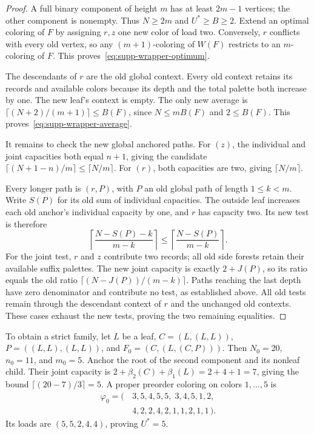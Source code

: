 \begin{proof}
A full binary component of height $m$ has at least $2m-1$ vertices;
the other component is nonempty. Thus $N\ge2m$ and $U^*\ge B\ge2$.
Extend an optimal coloring of $F$ by assigning $r,z$ one new color of
load two. Conversely, $r$ conflicts with every old vertex, so any
$(m+1)$-coloring of $W(F)$ restricts to an $m$-coloring of $F$.
This proves~\eqref{eq:supp-wrapper-optimum}.

The descendants of $r$ are the old global context. Every old context
retains its records and available colors because its depth and the
total palette both increase by one. The new leaf's context is empty.
The only new average is $\lceil(N+2)/(m+1)\rceil\le B(F)$, since
$N\le mB(F)$ and $2\le B(F)$. This proves~\eqref{eq:supp-wrapper-average}.

It remains to check the new global anchored paths. For $(z)$, the
individual and joint capacities both equal $n+1$, giving the candidate
$\lceil(N+1-n)/m\rceil\le\lceil N/m\rceil$. For $(r)$, both capacities
are two, giving $\lceil N/m\rceil$.

Every longer path is $(r,P)$, with $P$ an old global path of length
$1\le k<m$. Write $S(P)$ for its old sum of individual capacities.
The outside leaf increases each old anchor's individual capacity by
one, and $r$ has capacity two. Its new test is therefore
\begin{equation}
 \left\lceil\frac{N-S(P)-k}{m-k}\right\rceil
 \le \left\lceil\frac{N-S(P)}{m-k}\right\rceil.
 \label{eq:supp-wrapper-individual-test}
\end{equation}
For the joint test, $r$ and $z$ contribute two records; all old side
forests retain their available suffix palettes. The new joint
capacity is exactly $2+J(P)$, so its ratio equals the old ratio
$\lceil(N-J(P))/(m-k)\rceil$. Paths reaching the last depth have
zero denominator and contribute no test, as established above.
All old tests remain through the descendant context of $r$ and the
unchanged old contexts. These cases exhaust the new tests, proving
the two remaining equalities.
\end{proof}

To obtain a strict family, let $L$ be a leaf, $C=(L,(L,L))$,
$P=((L,L),(L,L))$, and $F_0=(C,(L,(C,P)))$. Then
$N_0=20$, $n_0=11$, and $m_0=5$. Anchor the root of the second
component and its nonleaf child. Their joint capacity is
$2+\beta_2(C)+\beta_1(L)=2+4+1=7$, giving the bound
$\lceil(20-7)/3\rceil=5$. A proper preorder coloring on colors
$1,\ldots,5$ is
\begin{equation}
 \begin{aligned}
 \varphi_0=(\, &3,5,4,5,5,\;3,4,5,1,2,\\
              &4,2,2,4,2,1,1,2,1,1\,).
 \end{aligned}
 \label{eq:supp-wrapper-seed-coloring}
\end{equation}
Its loads are $(5,5,2,4,4)$, proving $U^*=5$.

